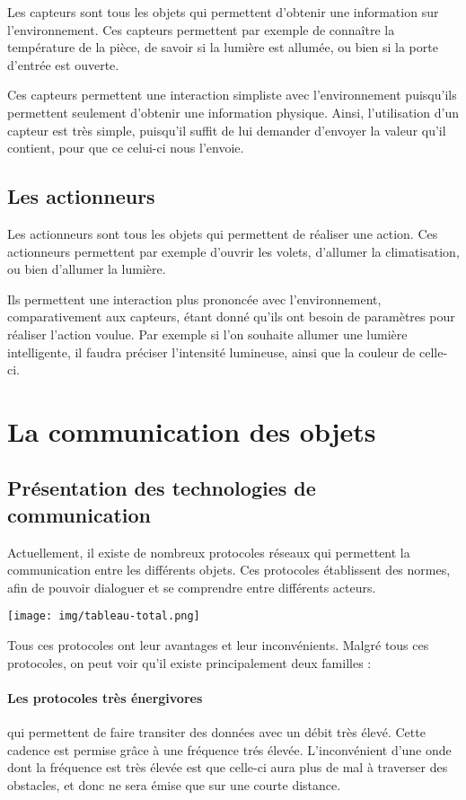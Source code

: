 Les capteurs sont tous les objets qui permettent d'obtenir une information sur l'environnement. Ces capteurs 
permettent par exemple de connaître la température de la pièce, de savoir si la lumière est allumée, ou 
bien si la porte d'entrée est ouverte.

Ces capteurs permettent une interaction simpliste avec l'environnement puisqu'ils permettent seulement 
d'obtenir une information physique. Ainsi, l'utilisation d'un capteur est très simple, puisqu'il suffit de 
lui demander d'envoyer la valeur qu'il contient, pour que ce celui-ci nous l'envoie.
	\subsection{Les actionneurs}
	
Les actionneurs sont tous les objets qui permettent de réaliser une action. Ces actionneurs permettent par 
exemple d'ouvrir les volets, d'allumer la climatisation, ou bien d'allumer la lumière.

Ils permettent une interaction plus prononcée avec l'environnement, comparativement aux capteurs, étant donné 
qu'ils ont besoin de paramètres pour réaliser l'action voulue. Par exemple si l'on souhaite allumer une 
lumière intelligente, il faudra préciser l'intensité lumineuse, ainsi que la couleur de celle-ci.

\section{La communication des objets}
	\subsection{Présentation des technologies de communication}
Actuellement, il existe de nombreux protocoles réseaux qui permettent la communication entre les différents 
objets. Ces protocoles établissent des normes, afin de pouvoir dialoguer et se comprendre entre différents 
acteurs.

\texttt{[image: img/tableau-total.png]} 

Tous ces protocoles ont leur avantages et leur inconvénients. Malgré tous ces protocoles, on peut voir qu'il 
existe principalement deux familles :

\paragraph{Les protocoles très énergivores}qui permettent de faire transiter des données avec un débit très 
élevé. Cette cadence est permise grâce à une fréquence trés élevée. L'inconvénient d'une onde dont la 
fréquence est très élevée est que celle-ci aura plus de mal à traverser des obstacles, et donc ne sera émise 
que sur une courte distance.

